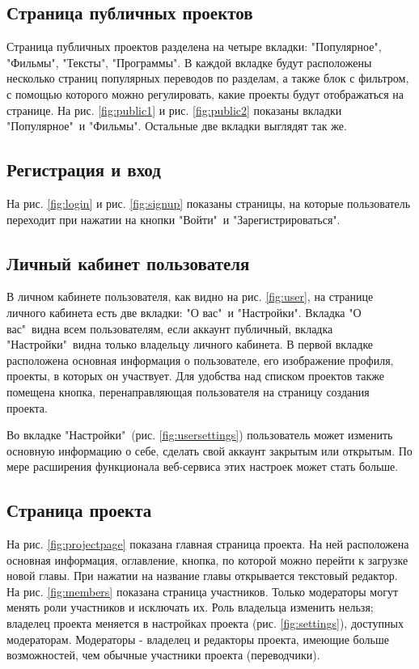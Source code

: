 \documentclass[a4paper,12pt]{article}
\begin{document}
\subsection{Страница публичных проектов}
Страница публичных проектов разделена на четыре вкладки: "Популярное", "Фильмы", "Тексты", "Программы". В каждой вкладке будут расположены несколько страниц популярных переводов по разделам, а также блок с фильтром, с помощью которого можно регулировать, какие проекты будут отображаться на странице. На рис. \ref{fig:public1} и рис. \ref{fig:public2} показаны вкладки "Популярное"\ и "Фильмы". Остальные две вкладки выглядят так же.


\subsection{Регистрация и вход}
На рис. \ref{fig:login} и рис. \ref{fig:signup} показаны страницы, на которые пользователь переходит при нажатии на кнопки "Войти"\ и "Зарегистрироваться".


\subsection{Личный кабинет пользователя}
В личном кабинете пользователя, как видно на рис. \ref{fig:user}, на странице личного кабинета есть две вкладки: "О вас"\ и "Настройки". Вкладка "О вас"\ видна всем пользователям, если аккаунт публичный, вкладка "Настройки"\ видна только владельцу личного кабинета.
В первой вкладке расположена основная информация о пользователе, его изображение профиля, проекты, в которых он участвует. Для удобства над списком проектов также помещена кнопка, перенаправляющая пользователя на страницу создания проекта.

Во вкладке "Настройки"\ (рис. \ref{fig:usersettings}) пользователь может изменить основную информацию о себе, сделать свой аккаунт закрытым или открытым. По мере расширения функционала веб-сервиса этих настроек может стать больше.


\newpage
\subsection{Страница проекта}
На рис. \ref{fig:projectpage} показана главная страница проекта. На ней расположена основная информация, оглавление, кнопка, по которой можно перейти к загрузке новой главы. При нажатии на название главы открывается текстовый редактор. На рис. \ref{fig:members} показана страница участников. Только модераторы могут менять роли участников и исключать их. Роль владельца изменить нельзя; владелец проекта меняется в настройках проекта (рис. \ref{fig:settings}), доступных модераторам. Модераторы - владелец и редакторы проекта, имеющие больше возможностей, чем обычные участники проекта (переводчики).
\end{document}
